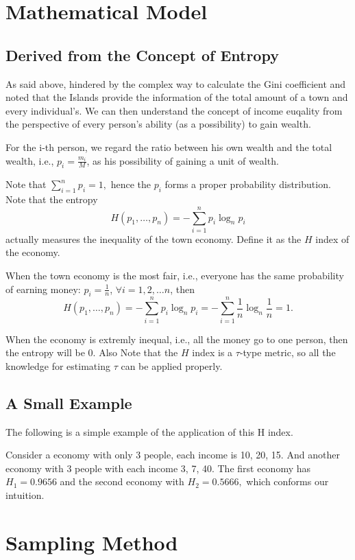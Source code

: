 \documentclass[12pt]{article}%
\begin{document}
\section{Mathematical Model}

\subsection{Derived from the Concept of Entropy}

As said above, hindered by the complex way to calculate the Gini coefficient and noted that the Islands provide the information of the total amount of a town and every individual's. 
We can then understand the concept of income euqality from the perspective of every person's ability (as a possibility) to gain wealth.

For the i-th person, we regard the ratio between his own wealth and the total wealth, 
i.e., $p_i=\frac{m_i}{M}$, as his possibility of gaining a unit of wealth.

Note that $\sum_{i=1}^{n}p_i=1,$ hence the $p_i$ forms a proper probability distribution. 
Note that the entropy $$H(p_1,\dots,p_n)=-\sum_{i=1}^{n}p_i\log_{n}{p_i}$$ actually measures the 
inequality of the town economy. Define it as the $H$ index of the economy.

When the town economy is the most fair, i.e., everyone has the same probability of earning money: 
$p_i=\frac{1}{n}$, $\forall i=1,2,\dots n$, then $$H(p_1,\dots, p_n)=-\sum_{i=1}^{n}p_i\log_{n}{p_i}=-\sum_{i=1}^{n}\frac{1}{n}\log_{n}{\frac{1}{n}}=1.$$ 

When the economy is extremly inequal, i.e., all the money go to one person, then the entropy will be 0. Also Note that the $H$ index is a $\tau$-type metric, so all the knowledge for estimating $\tau$ can be applied properly.

\subsection{A Small Example}

The following is a simple example of the application of this H index. 

Consider a economy with only 3 people, each income is 10, 20, 15. 
And another economy with 3 people with each income  3, 7, 40. The first economy has $H_1=0.9656$ and the second economy with $H_2=0.5666,$ which conforms our intuition.


\section{Sampling Method}
\end{document}
